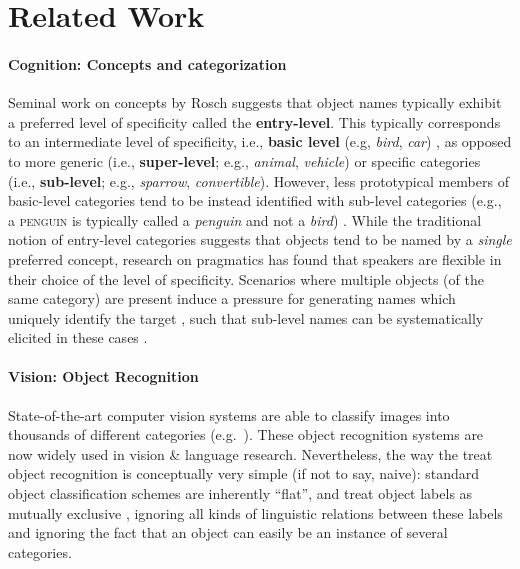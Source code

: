 \documentclass[11pt]{article}
\newcommand{\refexp}[1]{\textsl{#1}}
\newcommand{\cat}[1]{\textsc{#1}}
\begin{document}
\section{Related Work}
\label{sec:related}

\paragraph{Cognition: Concepts and categorization}

 Seminal work on concepts by Rosch suggests that object names typically exhibit a preferred level of specificity called the \textbf{entry-level}. This typically corresponds to an intermediate level of specificity, i.e., \textbf{basic level} (e.g, \refexp{bird}, \refexp{car}) \cite{rosch1976basic}, as opposed to more generic (i.e., \textbf{super-level}; e.g., \refexp{animal}, \refexp{vehicle}) or specific categories (i.e., \textbf{sub-level}; e.g., \refexp{sparrow}, \refexp{convertible}). However, less prototypical members of basic-level categories tend to be instead identified with sub-level categories (e.g., a \cat{penguin} is typically called a \refexp{penguin} and not a \refexp{bird}) \cite{jolicoeur1984pictures}. 
While the traditional notion of entry-level categories suggests that objects tend to be named by a \refexp{single} preferred concept, research on pragmatics has found that speakers are flexible in  
their choice of the level of specificity. 
Scenarios where multiple objects (of the same category) are present induce a pressure for generating names which uniquely identify the target \cite{olson1970language}, such that sub-level names can be systematically elicited in these cases %
\cite{rohde2012communicating}\cite{graf2016animal}.

\paragraph{Vision: Object Recognition}

State-of-the-art computer vision systems are able to classify images into thousands of different categories (e.g.\  ). These object recognition systems are now widely used in vision \& language research.
Nevertheless, the way the treat object recognition is conceptually very simple (if not to say, naive):  standard object classification schemes are inherently ``flat'', and treat object labels as mutually exclusive \cite{deng2014large}, ignoring all kinds of linguistic relations between these labels and ignoring the fact that an object can easily be an instance of several categories.
\end{document}
